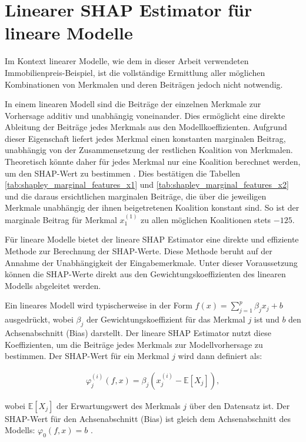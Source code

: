 \section{Linearer SHAP Estimator für lineare Modelle}
\label{subsec:linear-shap-estimator}

Im Kontext linearer Modelle, 
wie dem in dieser Arbeit verwendeten Immobilienpreis-Beispiel, 
ist die vollständige Ermittlung aller möglichen Kombinationen von Merkmalen und deren 
Beiträgen jedoch nicht notwendig. 

In einem linearen Modell sind die Beiträge der einzelnen Merkmale zur Vorhersage additiv 
und unabhängig voneinander. Dies ermöglicht eine direkte Ableitung der Beiträge 
jedes Merkmals aus den Modellkoeffizienten. Aufgrund dieser Eigenschaft 
liefert jedes Merkmal einen konstanten marginalen Beitrag, 
unabhängig von der Zusammensetzung der restlichen Koalition von Merkmalen. 
Theoretisch könnte daher für jedes Merkmal nur eine Koalition berechnet werden, 
um den SHAP-Wert zu bestimmen \cite[S. 38]{Molnar_2023}. Dies bestätigen die
Tabellen \ref{tab:shapley_marginal_features_x1} und \ref{tab:shapley_marginal_features_x2}
und die daraus ersichtlichen marginalen Beiträge, die über die jeweiligen Merkmale
unabhängig der ihnen beigetretenen Koalition konstant sind. So ist der marginale Beitrag für Merkmal $x_1^{(1)}$
zu allen möglichen Koalitionen stets $-125$.

Für lineare Modelle bietet der lineare SHAP Estimator eine direkte und effiziente 
Methode zur Berechnung der SHAP-Werte. Diese Methode beruht auf der Annahme 
der Unabhängigkeit der Eingabemerkmale. Unter dieser Voraussetzung können 
die SHAP-Werte direkt aus den Gewichtungskoeffizienten des linearen Modells 
abgeleitet werden.

Ein lineares Modell wird typischerweise in der Form 
\( f(x) = \sum_{j=1}^{p} \beta_j x_j + b \) ausgedrückt, wobei \( \beta_j \) der 
Gewichtungskoeffizient für das Merkmal \( j \) ist und \( b \) den 
Achsenabschnitt (Bias) darstellt. Der lineare SHAP Estimator nutzt 
diese Koeffizienten, um die Beiträge jedes Merkmals zur Modellvorhersage 
zu bestimmen. Der SHAP-Wert für ein Merkmal \( j \) wird dann definiert als:

\begin{align}
    \label{eq:shap-single}
    \varphi_j^{(i)}(f, x) = \beta_j (x_j^{(i)} - \mathbb{E}[X_j]),
\end{align}

wobei \( \mathbb{E}[X_j] \) der Erwartungswert des Merkmals \( j \) über den 
Datensatz ist. Der SHAP-Wert für den Achsenabschnitt (Bias) ist gleich 
dem Achsenabschnitt des Modells: \( \varphi_0(f, x) = b \) \cite[S. 6]{NIPS2017_8a20a862}.


